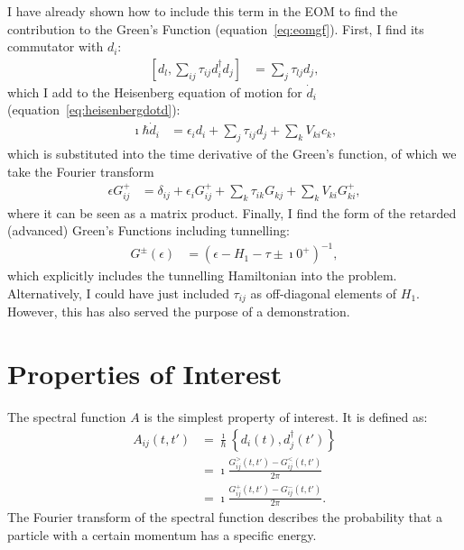 I have already shown how to include this term in the EOM to find the contribution to the Green's Function (equation~\ref{eq:eomgf}). First, I find its commutator with $d_i$:
\begin{align*}
\left[ d_l, \sum_{ij} \tau_{ij} d_i^\dagger d_j\right] &= \sum_j \tau_{lj} d_j,
\end{align*}which I add to the Heisenberg equation of motion for $\dot{d}_i$ (equation~\ref{eq:heisenbergdotd}):
\begin{align*}
\imath \hbar \dot{d}_i 
&= \epsilon_i d_i +  \sum_{j} \tau_{ij} d_j + \sum_{k}V_{ki} c_{k},
\end{align*} which is substituted into the time derivative of the Green's function, of which we take the Fourier transform
\begin{align*}
\epsilon G_{ij}^+ &= \delta_{ij} + \epsilon_i G^+_{ij}+ \sum_k \tau_{ik} G_{kj} + \sum_k V_{ki} G^+_{ki},
\end{align*}
where it can be seen as a matrix product. Finally, I find the form of the retarded (advanced) Green's Functions including tunnelling:
\begin{align*}
G^\pm(\epsilon) &= \left(\epsilon - H_1 - \tau \pm \imath 0^+\right)^{-1},
\end{align*} which explicitly includes the tunnelling Hamiltonian into the problem. Alternatively, I could have just included $\tau_{ij}$ as off-diagonal elements of $H_1$. However, this has also served the purpose of a demonstration.

\section{Properties of Interest}
\label{sec:properties}
The spectral function $A$ is the simplest property of interest. It is defined as\cite{seldenthuis}:
\begin{align}
A_{ij}(t, t') &= \frac{\imath}{\hbar} \left\{ d_i(t), d_j^\dagger(t')\right\} \\
&= \imath \frac{ G^>_{ij}(t, t') - G^<_{ij}(t, t')}{2\pi} \\
&= \imath \frac{G^+_{ij}(t, t') - G^-_{ij}(t, t')}{2\pi}.
\label{eq:spectral}
\end{align}
The Fourier transform of the spectral function describes the probability that a particle with a certain momentum has a specific energy. 

